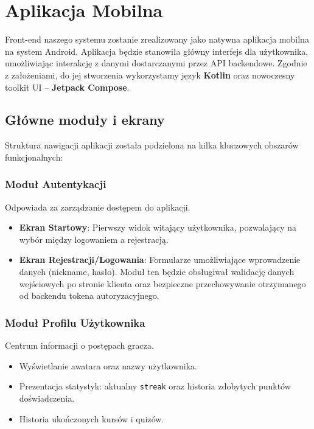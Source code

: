 \documentclass[11pt,a4paper]{article}
\numberwithin{equation}{section}
\begin{document}
\newpage
\section{Aplikacja Mobilna}
Front-end naszego systemu zostanie zrealizowany jako natywna aplikacja mobilna na system Android. Aplikacja będzie stanowiła główny interfejs dla użytkownika, umożliwiając interakcję z danymi dostarczanymi przez API backendowe. Zgodnie z założeniami, do jej stworzenia wykorzystamy język \textbf{Kotlin} oraz nowoczesny toolkit UI – \textbf{Jetpack Compose}.

\subsection{Główne moduły i ekrany}
Struktura nawigacji aplikacji została podzielona na kilka kluczowych obszarów funkcjonalnych:

\subsubsection{Moduł Autentykacji}
Odpowiada za zarządzanie dostępem do aplikacji.
\begin{itemize}
    \item \textbf{Ekran Startowy}: Pierwszy widok witający użytkownika, pozwalający na wybór między logowaniem a rejestracją.
    \item \textbf{Ekran Rejestracji/Logowania}: Formularze umożliwiające wprowadzenie danych (nickname, hasło). Moduł ten będzie obsługiwał walidację danych wejściowych po stronie klienta oraz bezpieczne przechowywanie otrzymanego od backendu tokena autoryzacyjnego.
\end{itemize}

\subsubsection{Moduł Profilu Użytkownika}
Centrum informacji o postępach gracza.
\begin{itemize}
    \item Wyświetlanie awatara oraz nazwy użytkownika.
    \item Prezentacja statystyk: aktualny \texttt{streak} oraz historia zdobytych punktów doświadczenia.
    \item Historia ukończonych kursów i quizów.
\end{itemize}
\end{document}

